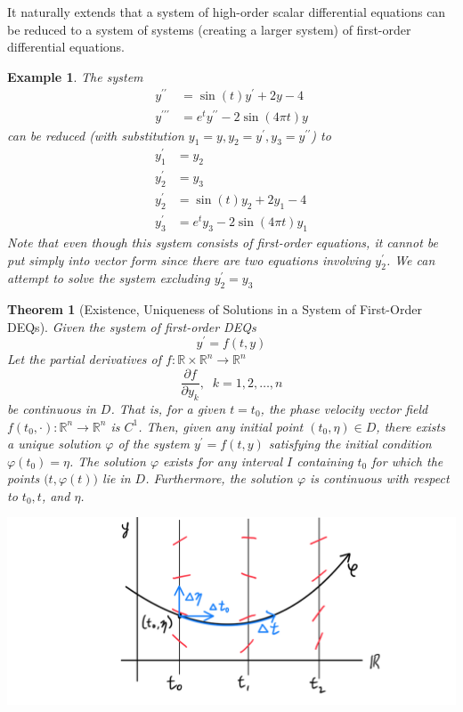 \documentclass{article}
\newtheorem{theorem}{Theorem}[section]
\newtheorem{example}{Example}[section]
\theoremstyle{remark}
\theoremstyle{definition}
\begin{document}
    It naturally extends that a system of high-order scalar differential equations can be reduced to a system of systems (creating a larger system) of first-order differential equations. 

    \begin{example}
    The system 
    \begin{align*}
        y^{\prime\prime} & = \sin{(t)} y^\prime + 2y - 4 \\
        y^{\prime\prime\prime} & = e^t y^{\prime\prime} - 2\sin{(4\pi t)} y
    \end{align*}
    can be reduced (with substitution $y_1 = y, y_2 = y^\prime, y_3 = y^{\prime\prime}$) to 
    \begin{align*}
        y_1^\prime & = y_2 \\
        y_2^\prime & = y_3 \\
        y_2^\prime & = \sin(t) y_2 + 2y_1 - 4 \\
        y_3^\prime & = e^t y_3 - 2\sin{(4\pi t)} y_1
    \end{align*}
    Note that even though this system consists of first-order equations, it cannot be put simply into vector form since there are two equations involving $y_2^\prime$. We can attempt to solve the system excluding $y_2^\prime = y_3$
    \end{example}

    \begin{theorem}[Existence, Uniqueness of Solutions in a System of First-Order DEQs]
    Given the system of first-order DEQs 
    \[y^\prime = f(t, y)\]
    Let the partial derivatives of $f: \mathbb{R} \times \mathbb{R}^n \longrightarrow \mathbb{R}^n$
    \[\frac{\partial f}{\partial y_k}, \;\; k = 1, 2, \ldots, n\]
    be continuous in $D$. That is, for a given $t = t_0$, the phase velocity vector field $f(t_0, \cdot): \mathbb{R}^n \longrightarrow \mathbb{R}^n$ is $C^1$. Then, given any initial point $(t_0, \eta) \in D$, there exists a unique solution $\varphi$ of the system $y^\prime = f(t, y)$ satisfying the initial condition $\varphi(t_0) = \eta$. The solution $\varphi$ exists for any interval $I$ containing $t_0$ for which the points $\big(t, \varphi(t)\big)$ lie in $D$. Furthermore, the solution $\varphi$ is continuous with respect to $t_0, t$, and $\eta$. 
    \begin{center}
        \includegraphics[scale=0.25]{img/Continuous_w_respect_to_3_things.PNG}
    \end{center}
    \end{theorem}
\end{document}
